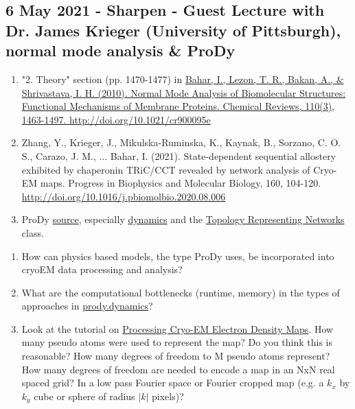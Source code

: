 \documentclass[11pt, oneside]{article}   	%
\begin{document}
\subsection{6 May 2021 - Sharpen - Guest Lecture with Dr. James Krieger (University of Pittsburgh), normal mode analysis \& ProDy}
\begin{enumerate}
	\item "2. Theory" section (pp. 1470-1477) in \href{https://www.ncbi.nlm.nih.gov/pmc/articles/PMC2836427/}{Bahar, I., Lezon, T. R., Bakan, A., \& Shrivastava, I. H. (2010). Normal Mode Analysis of Biomolecular Structures: Functional Mechanisms of Membrane Proteins. Chemical Reviews, 110(3), 1463-1497. http://doi.org/10.1021/cr900095e}
	\item Zhang, Y., Krieger, J., Mikulska-Ruminska, K., Kaynak, B., Sorzano, C. O. S., Carazo, J. M., ... Bahar, I. (2021). State-dependent sequential allostery exhibited by chaperonin TRiC/CCT revealed by network analysis of Cryo-EM maps. Progress in Biophysics and Molecular Biology, 160, 104-120. \url{http://doi.org/10.1016/j.pbiomolbio.2020.08.006}
	\item ProDy \href{https://github.com/prody/ProDy}{source}, especially \href{https://github.com/prody/ProDy/tree/master/prody/dynamics}{dynamics} and the \href{https://github.com/prody/ProDy/blob/master/prody/proteins/emdfile.py#L466}{Topology Representing Networks} class.
\end{enumerate}
\begin{enumerate}
	\item How can physics based models, the type ProDy uses, be incorporated into cryoEM data processing and analysis?
	\item What are the computational bottlenecks (runtime, memory) in the types of approaches in \href{https://github.com/prody/ProDy/tree/master/prody/dynamics}{prody.dynamics}?
	\item Look at the tutorial on \href{http://prody.csb.pitt.edu/tutorials/cryoem_tutorial/em_analysis.html#map-pseudo-atoms-to-pdb-atomic-model}{Processing Cryo-EM Electron Density Maps}. How many pseudo atoms were used to represent the map? Do you think this is reasonable? How many degrees of freedom to M pseudo atoms represent? How many degrees of freedom are needed to encode a map in an NxN real spaced grid? In a low pass Fourier space or Fourier cropped map (e.g. a $k_x$ by $k_y$ cube or sphere of radius $|k|$ pixels)?
\end{enumerate}
\end{document}
